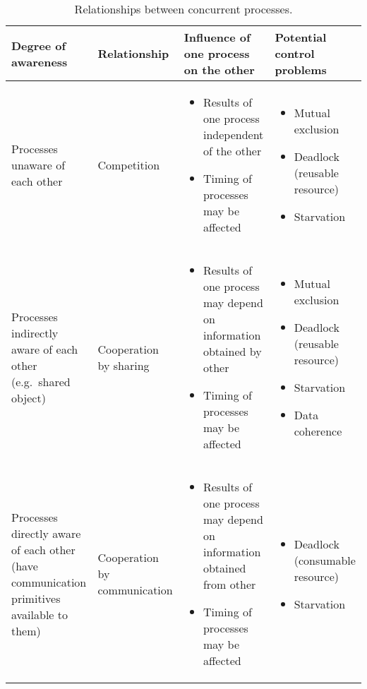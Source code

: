 \begin{table}[htp]
  \centering
  \caption*{Relationships between concurrent processes.}
  \begin{tabular}{p{3cm}p{2cm}p{4cm}p{4cm}}
    \toprule
    Degree of awareness & Relationship & Influence of one process on the other & Potential control problems \\
    \midrule
    Processes unaware of each other & Competition & \begin{itemize}
      \item Results of one process independent of the other
      \item Timing of processes may be affected
    \end{itemize} & \begin{itemize}
      \item Mutual exclusion
      \item Deadlock (reusable resource)
      \item Starvation
    \end{itemize} \\
    Processes indirectly aware of each other (e.g.\ shared object) & Cooperation by sharing & \begin{itemize}
      \item Results of one process may depend on information obtained by other
      \item Timing of processes may be affected
    \end{itemize} & \begin{itemize}
      \item Mutual exclusion
      \item Deadlock (reusable resource)
      \item Starvation
      \item Data coherence
    \end{itemize} \\
    Processes directly aware of each other (have communication primitives available to them) & Cooperation by communication & \begin{itemize}
      \item Results of one process may depend on information obtained from other
      \item Timing of processes may be affected
    \end{itemize} & \begin{itemize}
      \item Deadlock (consumable resource)
      \item Starvation
    \end{itemize} \\
    \bottomrule
  \end{tabular}
\end{table}

